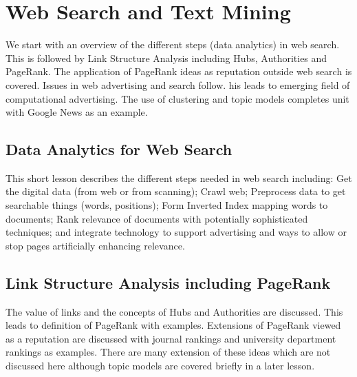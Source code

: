 \section{Web Search and Text Mining}\label{web-search-and-text-mining-ii}


We start with an overview of the different steps (data analytics) in web
search. This is followed by Link Structure Analysis including Hubs,
Authorities and PageRank. The application of PageRank ideas as
reputation outside web search is covered. Issues in web advertising and
search follow. his leads to emerging field of computational advertising.
The use of clustering and topic models completes unit with Google News
as an example.



\subsection{Data Analytics for Web Search}\label{data-analytics-for-web-search}


This short lesson describes the different steps needed in web search
including: Get the digital data (from web or from scanning); Crawl web;
Preprocess data to get searchable things (words, positions); Form
Inverted Index mapping words to documents; Rank relevance of documents
with potentially sophisticated techniques; and integrate technology to
support advertising and ways to allow or stop pages artificially
enhancing relevance.




\subsection{Link Structure Analysis including PageRank}


The value of links and the concepts of Hubs and Authorities are
discussed. This leads to definition of PageRank with examples.
Extensions of PageRank viewed as a reputation are discussed with journal
rankings and university department rankings as examples. There are many
extension of these ideas which are not discussed here although topic
models are covered briefly in a later lesson.



